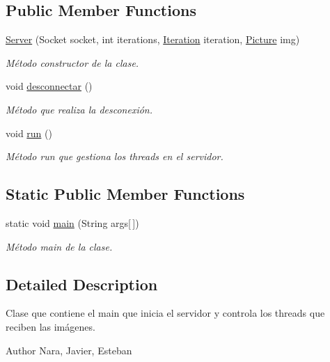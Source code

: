 \subsection*{Public Member Functions}
\begin{DoxyCompactItemize}
\item 
\hyperlink{class_server_a906efb564818baa15e207fc6d4b26b3f}{Server} (Socket socket, int iterations, \hyperlink{class_iteration}{Iteration} iteration, \hyperlink{class_picture}{Picture} img)
\begin{DoxyCompactList}\small\item\em Método constructor de la clase. \end{DoxyCompactList}\item 
void \hyperlink{class_server_a2f44e49f6ef4699f17b88314bc2104c6}{desconnectar} ()
\begin{DoxyCompactList}\small\item\em Método que realiza la desconexión. \end{DoxyCompactList}\item 
void \hyperlink{class_server_ace0ce586af36c8024040a43db4054ab7}{run} ()
\begin{DoxyCompactList}\small\item\em Método run que gestiona los threads en el servidor. \end{DoxyCompactList}\end{DoxyCompactItemize}
\subsection*{Static Public Member Functions}
\begin{DoxyCompactItemize}
\item 
static void \hyperlink{class_server_ad90c92078da8d9c8a084e7cbc6cff4af}{main} (String args\mbox{[}$\,$\mbox{]})
\begin{DoxyCompactList}\small\item\em Método main de la clase. \end{DoxyCompactList}\end{DoxyCompactItemize}


\subsection{Detailed Description}
Clase que contiene el main que inicia el servidor y controla los threads que reciben las imágenes. 

\begin{DoxyAuthor}{Author}
Nara, Javier, Esteban 
\end{DoxyAuthor}


